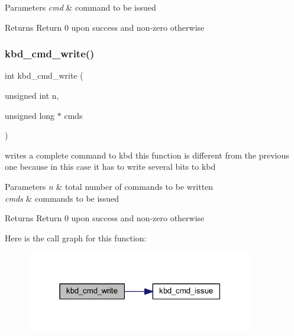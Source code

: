 \begin{DoxyParams}{Parameters}
{\em cmd} & command to be issued \\
\hline
\end{DoxyParams}
\begin{DoxyReturn}{Returns}
Return 0 upon success and non-\/zero otherwise 
\end{DoxyReturn}
\hypertarget{group__kbc_ga9a48bf91bd53208baa5627dd2a39e24d}{}\label{group__kbc_ga9a48bf91bd53208baa5627dd2a39e24d} 
\subsubsection{\texorpdfstring{kbd\+\_\+cmd\+\_\+write()}{kbd\_cmd\_write()}}
{\footnotesize\ttfamily int kbd\+\_\+cmd\+\_\+write (\begin{DoxyParamCaption}\item[{unsigned int}]{n,  }\item[{unsigned long $\ast$}]{cmds }\end{DoxyParamCaption})}



writes a complete command to kbd this function is different from the previous one because in this case it has to write several bits to kbd 


\begin{DoxyParams}{Parameters}
{\em n} & total number of commands to be written \\
\hline
{\em cmds} & commands to be issued \\
\hline
\end{DoxyParams}
\begin{DoxyReturn}{Returns}
Return 0 upon success and non-\/zero otherwise 
\end{DoxyReturn}
Here is the call graph for this function\+:\nopagebreak
\begin{figure}[H]
\begin{center}
\leavevmode
\includegraphics[width=283pt]{group__kbc_ga9a48bf91bd53208baa5627dd2a39e24d_cgraph}
\end{center}
\end{figure}
\hypertarget{group__kbc_ga8efa408da2468eaa11a0c515dfa8d79f}{}\label{group__kbc_ga8efa408da2468eaa11a0c515dfa8d79f} 
